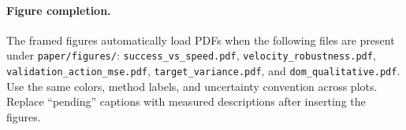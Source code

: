 \documentclass[10pt,twocolumn,letterpaper]{article}
\begin{document}
\paragraph{Figure completion.}
The framed figures automatically load PDFs when the following files are
present under \texttt{paper/figures/}: \texttt{success\_vs\_speed.pdf},
\texttt{velocity\_robustness.pdf}, \texttt{validation\_action\_mse.pdf},
\texttt{target\_variance.pdf}, and \texttt{dom\_qualitative.pdf}. Use the same
colors, method labels, and uncertainty convention across plots. Replace
``pending'' captions with measured descriptions after inserting the figures.
\end{document}

